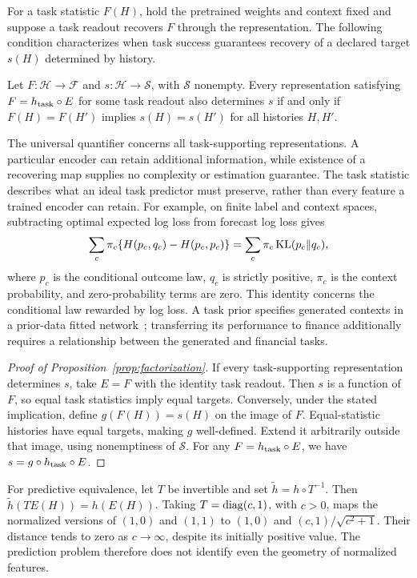\documentclass[11pt]{article}
\renewcommand{\lean}[1]{\ignorespaces}
\renewcommand{\leanok}{\ignorespaces}
\begin{document}
For a task statistic $F(H)$, hold the pretrained weights and context fixed and
suppose a task readout recovers $F$ through the representation. The following
condition characterizes when task success guarantees recovery of a declared
target $s(H)$ determined by history.
\begin{proposition}\label{prop:factorization}
  \lean{FreeFoundations.Alignment.optimal_imp_sufficient_iff}\leanok{}
  Let $F:\mathcal H\to\mathcal F$ and $s:\mathcal H\to\mathcal S$, with
  $\mathcal S$ nonempty. Every representation satisfying
  $F=h_{\rm task}\circ E$ for some task readout also determines $s$
  if and only if
  $F(H)=F(H')$ implies $s(H)=s(H')$ for all histories $H,H'$.
\end{proposition}
The universal quantifier concerns all task-supporting representations. A
particular encoder can retain additional information, while existence of a
recovering map supplies no complexity or estimation guarantee.
The task statistic describes what an ideal task predictor must preserve,
rather than every feature a trained encoder can retain. For example,
on finite label and context spaces, subtracting optimal
expected log loss from forecast log loss gives
\[
  \sum_c\pi_c\{H(p_c,q_c)-H(p_c,p_c)\}
  =\sum_c\pi_c\operatorname{KL}(p_c\Vert q_c),
\]
where $p_c$ is the conditional outcome law, $q_c$ is strictly positive,
$\pi_c$ is the context probability, and zero-probability terms are zero.
\lean{FreeFoundations.Score.pretraining_excess}\leanok{}
This identity concerns the conditional law rewarded by log loss. A task prior
specifies generated contexts in a prior-data fitted
network~\cite{muller2022,nagler2023};
transferring its performance to finance additionally requires a relationship
between the generated and financial tasks.

\begin{proof}[Proof of Proposition~\ref{prop:factorization}]
  If every task-supporting representation determines $s$, take $E=F$ with
  the identity task readout. Then $s$ is a function of $F$, so equal task
  statistics imply equal targets. Conversely, under the stated implication,
  define $g(F(H))=s(H)$ on the image of $F$. Equal-statistic histories have
  equal targets, making $g$ well-defined. Extend it arbitrarily outside that
  image, using nonemptiness of $\mathcal S$. For any
  $F=h_{\rm task}\circ E$, we have $s=g\circ h_{\rm task}\circ E$.
\end{proof}

For predictive equivalence, let $T$ be invertible and set
$\widetilde h=h\circ T^{-1}$. Then
$\widetilde h(T E(H))=h(E(H))$.
Taking $T=\operatorname{diag}(c,1)$, with $c>0$, maps the normalized versions of $(1,0)$ and
$(1,1)$ to $(1,0)$ and $(c,1)/\sqrt{c^2+1}$. Their distance tends to zero as
$c\to\infty$, despite its initially positive value. The prediction problem
therefore does not identify even the geometry of normalized features.
\end{document}
